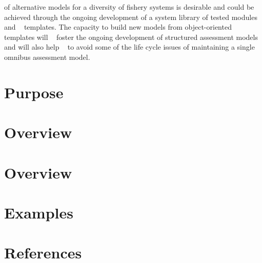  of alternative models for a diversity of fishery systems is desirable and could be ~\newline
 achieved through the ongoing development of a system library of tested modules and ~\newline
 templates. The capacity to build new models from object-\/oriented templates will ~\newline
 foster the ongoing development of structured assessment models and will also help ~\newline
 to avoid some of the life cycle issues of maintaining a single omnibus assessment model. \hypertarget{index_Purpose}{}\section{Purpose}\label{index_Purpose}
\hypertarget{index_System}{}\section{Overview}\label{index_System}
\hypertarget{index_System}{}\section{Overview}\label{index_System}
\hypertarget{index_Examples}{}\section{Examples}\label{index_Examples}
\hypertarget{MAS.hpp_References}{}\section{References}\label{MAS.hpp_References}

